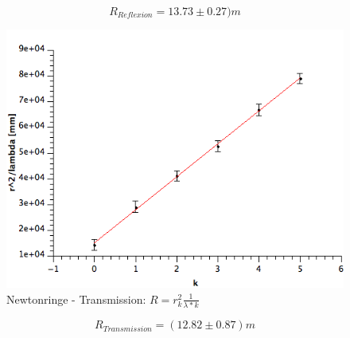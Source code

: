 \documentclass[12pt,a4paper]{article}
\begin{document}
$$R_{Reflexion} = 13.73 \pm 0.27)m$$



\begin{figure}[H]
	\centering
	\includegraphics[scale=0.60]{./figure/newtonringe_transmiss_regress.png}
	\caption{Newtonringe - Transmission: $R=r_k^2\frac{1}{\lambda *k}$}
	\label{fig:newtonringe_transmiss_regress}
\end{figure}

$$R_{Transmission}=(12.82 \pm 0.87)m$$
\end{document}
